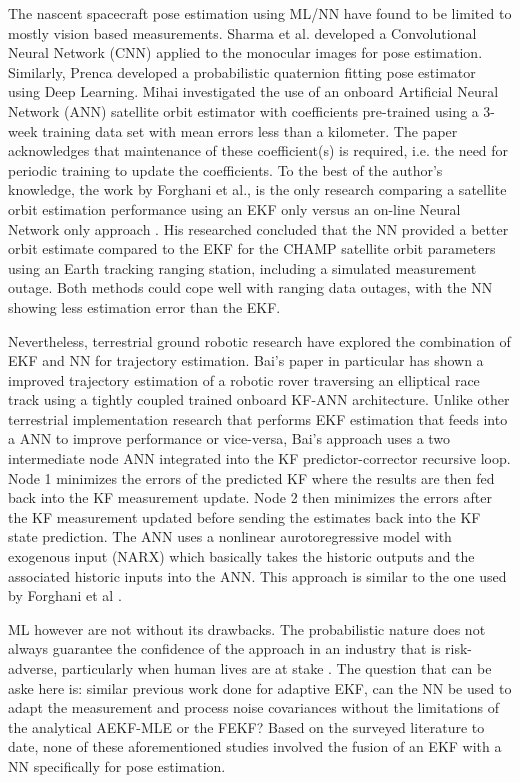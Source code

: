 The nascent spacecraft pose estimation using ML/NN have found to be limited to mostly vision based measurements. Sharma et al. \cite{sharmePoseNonCYYb} developed a Convolutional Neural Network (CNN) applied to the monocular images for pose estimation. Similarly, Prenca \cite{prencaDlPosePhotorealistic19} developed a probabilistic quaternion fitting pose estimator using Deep Learning. Mihai \cite{mihaiPoseAnn20} investigated the use of an onboard Artificial Neural Network (ANN) satellite orbit estimator with coefficients pre-trained using a 3-week training data set with mean errors less than a kilometer. The paper acknowledges that maintenance of these coefficient(s) is required, i.e. the need for periodic training to update the coefficients. To the best of the author's knowledge, the work by Forghani et al.,  is the only research comparing a satellite orbit estimation performance using an EKF only versus an on-line Neural Network only approach \cite{ForghaniOrbitNN11}. His researched concluded that the NN provided a better orbit estimate compared to the EKF for the CHAMP satellite orbit parameters using an Earth tracking ranging station, including a simulated measurement outage. Both methods could cope well with ranging data outages, with the NN showing less estimation error than the EKF. 

Nevertheless, terrestrial ground robotic research have explored the combination of EKF and NN for trajectory estimation. Bai's \cite{baiKf20} paper in particular has shown a improved trajectory estimation of a robotic rover traversing an elliptical race track using a tightly coupled trained onboard KF-ANN architecture. Unlike other terrestrial implementation research that performs EKF estimation that feeds into a ANN to improve performance or vice-versa, Bai's approach uses a two intermediate node ANN integrated into the KF predictor-corrector recursive loop. Node 1 minimizes the errors of the predicted KF where the results are then fed back into the KF measurement update. Node 2 then minimizes the errors after the KF measurement updated before sending the estimates back into the KF state prediction. The ANN uses a nonlinear aurotoregressive model with exogenous input (NARX) which basically takes the historic outputs and the associated historic inputs into the ANN. This approach is similar to the one used by Forghani et al \cite{ForghaniOrbitNN11}.     

ML however are not without its drawbacks. The probabilistic nature does not always guarantee the confidence of the approach in an industry that is risk-adverse, particularly when human lives are at stake \cite{yangML21}. The question that can be aske here is: similar previous work done for adaptive EKF, can the NN be used to adapt the measurement and process noise covariances without the limitations of the analytical AEKF-MLE or the FEKF? Based on the surveyed literature to date, none of these aforementioned studies involved the fusion of an EKF with a NN specifically for pose estimation. 
 
